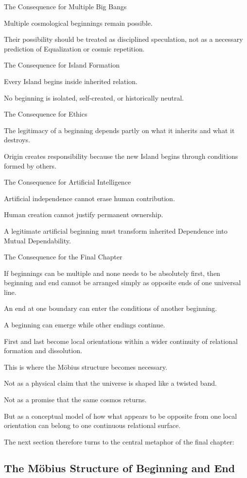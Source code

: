 The Consequence for Multiple Big Bangs

Multiple cosmological beginnings remain possible.

Their possibility should be treated as disciplined speculation, not as a necessary prediction of Equalization or cosmic repetition.

The Consequence for Island Formation

Every Island begins inside inherited relation.

No beginning is isolated, self-created, or historically neutral.

The Consequence for Ethics

The legitimacy of a beginning depends partly on what it inherits and what it destroys.

Origin creates responsibility because the new Island begins through conditions formed by others.

The Consequence for Artificial Intelligence

Artificial independence cannot erase human contribution.

Human creation cannot justify permanent ownership.

A legitimate artificial beginning must transform inherited Dependence into Mutual Dependability.

The Consequence for the Final Chapter

If beginnings can be multiple and none needs to be absolutely first, then beginning and end cannot be arranged simply as opposite ends of one universal line.

An end at one boundary can enter the conditions of another beginning.

A beginning can emerge while other endings continue.

First and last become local orientations within a wider continuity of relational formation and dissolution.

This is where the Möbius structure becomes necessary.

Not as a physical claim that the universe is shaped like a twisted band.

Not as a promise that the same cosmos returns.

But as a conceptual model of how what appears to be opposite from one local orientation can belong to one continuous relational surface.

The next section therefore turns to the central metaphor of the final chapter:

\subsection*{\textbf{The Möbius Structure of Beginning and End}} 

